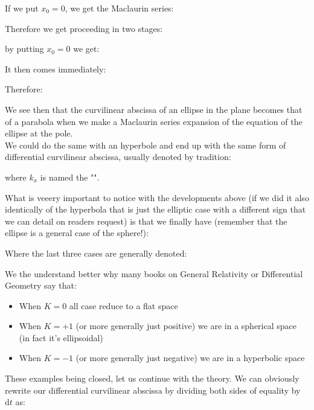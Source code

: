 {\begin{tcolorbox}[colframe=black,colback=white,sharp corners]
	If we put $x_0=0$, we get the Maclaurin series:
	
	Therefore we get proceeding in two stages:
	
	\end{tcolorbox}
	\begin{tcolorbox}[colframe=black,colback=white,sharp corners]
	
	by putting $x_0=0$ we get:
	
	It then comes immediately:
	
	Therefore:
	
	\end{tcolorbox}
	
	\pagebreak
	\begin{tcolorbox}[colframe=black,colback=white,sharp corners]
	We see then that the curvilinear abscissa of an ellipse in the plane becomes that of a parabola when we make a Maclaurin series expansion of the equation of the ellipse at the pole.\\
	
	We could do the same with an hyperbole and end up with the same form of differential curvilinear abscissa, usually denoted by tradition:
	
	where $k_x$ is named the "".
	\end{tcolorbox}
	\label{curvature parameter} What is veeery important to notice with the developments above (if we did it also identically of the hyperbola that is just the elliptic case with a different sign that we can detail on readers request) is that we finally have (remember that the ellipse is a general case of the sphere!):
	
	Where the last three cases are generally denoted:
	
	We the understand better why many books on General Relativity or Differential Geometry say that:
	\begin{itemize}
		\item When $K=0$ all case reduce to a flat space
		
		\item When $K=+1$ (or more generally just positive) we are in a spherical space (in fact it's ellipsoidal)
		
		\item When $K=-1$ (or more generally just negative) we are in a hyperbolic space
	\end{itemize}
	These examples being closed, let us continue with the theory. We can obviously rewrite our differential curvilinear abscissa by dividing both sides of equality by $\mathrm{d}t$ as:
	
}
